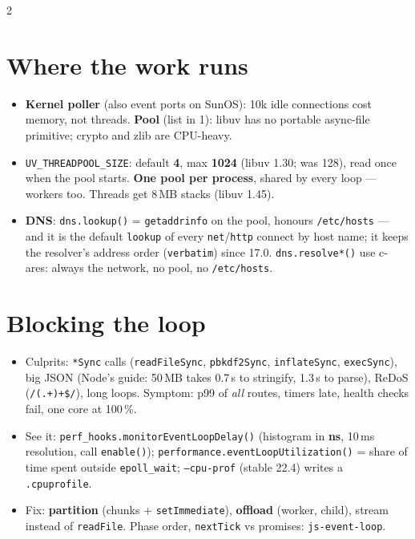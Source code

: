 \documentclass[8pt]{extarticle}
\newcommand\ct[1]{\texttt{#1}}
\begin{document}
\begin{multicols}{2}
\section{Where the work runs}
\begin{itemize}
  \item \textbf{Kernel poller} (also event ports on SunOS): 10k idle connections cost memory,
        not threads. \textbf{Pool} (list in 1): libuv has no portable async-file primitive;
        crypto and zlib are CPU-heavy.
  \item \ct{UV\_THREADPOOL\_SIZE}: default \textbf{4}, max \textbf{1024} (libuv 1.30; was 128),
        read once when the pool starts. \textbf{One pool per process}, shared by every loop —
        workers too. Threads get 8\,MB stacks (libuv 1.45).
  \item \textbf{DNS}: \ct{dns.lookup()} = \ct{getaddrinfo} on the pool, honours
        \ct{/etc/hosts} — and it is the default \ct{lookup} of every \ct{net}/\ct{http}
        connect by host name; it keeps the resolver's address order (\ct{verbatim}) since 17.0.
        \ct{dns.resolve*()} use c-ares: always the network, no pool, no \ct{/etc/hosts}.
\end{itemize}

\section{Blocking the loop}
\begin{itemize}
  \item Culprits: \ct{*Sync} calls (\ct{readFileSync}, \ct{pbkdf2Sync}, \ct{inflateSync},
        \ct{execSync}), big JSON (Node's guide: 50\,MB takes 0.7\,s to stringify, 1.3\,s to
        parse), ReDoS (\ct{/(.+)+\$/}), long loops. Symptom: p99 of \emph{all} routes, timers
        late, health checks fail, one core at 100\,\%.
  \item See it: \ct{perf\_hooks.monitorEventLoopDelay()} (histogram in \textbf{ns}, 10\,ms
        resolution, call \ct{enable()}); \ct{performance.eventLoopUtilization()} = share of time
        spent outside \ct{epoll\_wait}; \ct{--cpu-prof} (stable 22.4) writes a \ct{.cpuprofile}.
  \item Fix: \textbf{partition} (chunks + \ct{setImmediate}), \textbf{offload} (worker, child),
        stream instead of \ct{readFile}. Phase order, \ct{nextTick} vs promises:
        \ct{js-event-loop}.
\end{itemize}


\end{multicols}
\end{document}

